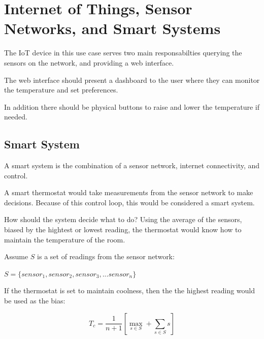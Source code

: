 \documentclass[10pt, journal]{IEEEtran} %
\begin{document}




\section{Internet of Things, Sensor Networks, and Smart Systems}

The IoT device in this use case serves two main responsabilties 
querying the sensors on the network, and providing a web interface.

The web interface should present a dashboard to the user where they can
monitor the temperature and set preferences.

In addition there should be physical buttons to raise and lower the temperature if needed.

\subsection{Smart System}

A smart system is the combination of a sensor network, internet connectivity, and control.

A smart thermostat would take measurements from the sensor network to make decisions.
Because of this control loop, this would be considered a smart system.

How should the system decide what to do? 
Using the average of the sensors, biased by the hightest or lowest reading,
the thermostat would know how to maintain the temperature of the room.


Assume $S$ is a set of readings from the sensor network:

$S = \{sensor_1, sensor_2, sensor_3, ...sensor_n\}$

\bigskip

If the thermostat is set to maintain coolness,
then the the highest reading would be used as the bias:

\[
T_c = \frac{1}{n+1}\left[ \max_{s \in S} + \sum_{s \in S}{s} \right]
\]

\smallskip
\end{document}
